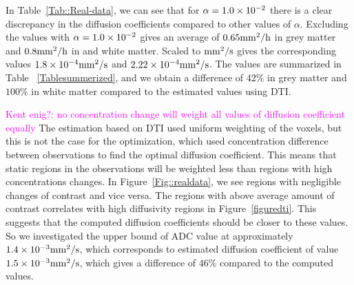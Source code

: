 \documentclass[12pt,a4paper]{article}
\newcommand{\lars}[1]{\textcolor{magenta}{#1}}
\begin{document}
In Table~\ref{Tab::Real-data}, we can see that for $\alpha=1.0\times 10\sp{-2}$ there is a clear discrepancy in the diffusion coefficients compared to other values of $\alpha$. Excluding the values with $\alpha=1.0\times 10\sp{-2}$ gives an average of $ 0.65 \mathrm{mm\sp{2}/h}$ in grey matter and $ 0.8 \mathrm{mm\sp{2}/h}$ in and white matter. Scaled to $\mathrm{mm\sp{2}/s}$ gives the corresponding values $1.8\times 10\sp{-4}\mathrm{mm\sp{2}/s}$ and $2.22\times 10\sp{-4} \mathrm{mm\sp{2}/s}$. The values are summarized in Table ~\ref{Tablesummerized}, and we obtain a difference of $42\%$ in grey matter and $ 100 \%$ in white matter compared to the estimated values using DTI.

\lars{ Kent enig?: no concentration change will weight all values of diffusion coefficient equally} 
The estimation based on DTI used uniform weighting of the voxels, but this is not the case for the optimization, which used concentration difference between observations to find the optimal diffusion coefficient. This means that static regions in the observations will be weighted less than regions with high concentrations changes. In Figure~\ref{Fig::realdata}, we see regions with negligible changes of contrast and vice versa. The regions with above average amount of contrast correlates with high diffusivity regions in Figure~\ref{figuredti}. This suggests that the computed diffusion coefficients should be closer to these values. So we investigated the upper bound of ADC value at approximately $1.4\times 10\sp{-3} \mathrm{mm\sp{2}/s}$, which corresponds to estimated diffusion coefficient of value $1.5\times 10\sp{-3} \mathrm{mm\sp{2}/s}$, which gives a difference of 46\% compared to the computed values.
\end{document}
